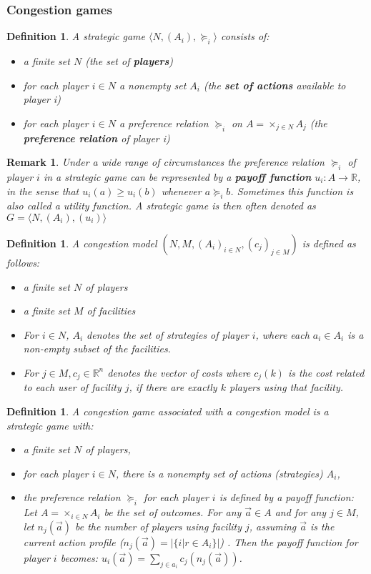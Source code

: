 \documentclass[a4paper,11pt]{article}
\newtheorem{definition}[theorem]{Definition}
\newtheorem{remark}[theorem]{Remark}
\newcommand{\R}{{\mathbb R}}
\begin{document}
\subsubsection{Congestion games}
\begin{definition}\cite{2}
A strategic game $\langle N, (A_i), \succeq_i\rangle$ consists of:
\begin{itemize}
  \item a finite set $N$  (the set of \textbf{players})
  \item for each player $i \in N$ a nonempty set $A_i$ (the \textbf{set of actions} available to player i)
  \item for each player $i \in N$ a preference relation $\succeq_i$ on $A=\times_{j\in N}A_j$ (the \textbf{preference relation} of player i)
\end{itemize}
\end{definition}
\begin{remark}
Under a wide range of circumstances the preference relation  $\succeq_i$ of player $i$ in a strategic game can be represented by a \textbf{payoff function} $u_i: A \rightarrow \R$, in the sense that $u_i(a) \geq u_i(b)$ whenever $a \succeq_i b$. Sometimes this function is also called a utility function. A strategic game is then often denoted as $G = \langle N, (A_i), (u_i)\rangle$
\end{remark}
\begin{definition}\cite{4}
A congestion model $(N, M, (A_i)_{i\in N}, (c_j)_{j\in M})$ is defined as follows:
\begin{itemize}
  \item a finite set $N$ of players
  \item a finite set $M$ of facilities
  \item For $i \in N$, $A_i$ denotes the set of strategies of player $i$, where each $a_i \in A_i$ is a non-empty subset of the facilities.
  \item For $j \in M, c_j \in \R^n$ denotes the vector of costs where $c_j(k)$ is the cost related to each user of facility $j$, if there are exactly $k$ players using that facility.
\end{itemize}
\end{definition}
\begin{definition}\cite{2,4}
A congestion game associated with a congestion model is a strategic game with:
\begin{itemize}
  \item a finite set $N$ of players,
  \item for each player $i \in N$, there is a nonempty set of actions (strategies) $A_i$,
  \item the preference relation $\succeq_i$ for each player $i$ is defined by a payoff function: Let $A =\times_{i\in N}A_i$ be the set of outcomes. For any $\vec{a} \in A$ and for any $j \in M$, let $n_j(\vec{a})$ be the number of players using facility $j$, assuming $\vec{a}$ is the current action profile ($n_j(\vec{a}) = |\{i | r \in A_i\}|$) .  Then the payoff function for player $i$ becomes: $u_i(\vec{a}) = \sum_{j\in a_i} c_j(n_j(\vec{a}))$.

\end{itemize}
\end{definition}
\end{document}
